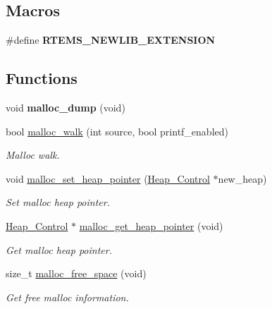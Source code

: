 \subsection*{Macros}
\begin{DoxyCompactItemize}
\item 
\#define {\bfseries R\+T\+E\+M\+S\+\_\+\+N\+E\+W\+L\+I\+B\+\_\+\+E\+X\+T\+E\+N\+S\+I\+ON}
\end{DoxyCompactItemize}
\subsection*{Functions}
\begin{DoxyCompactItemize}
\item 
\mbox{\label{group__libcsupport_ga984dfa88a9838d6dc1f39b7ccdf52274}} 
void {\bfseries malloc\+\_\+dump} (void)
\item 
\mbox{\label{group__libcsupport_ga503eebc15fd2bdcced2b1ea235713f6a}} 
bool \mbox{\hyperlink{group__libcsupport_ga503eebc15fd2bdcced2b1ea235713f6a}{malloc\+\_\+walk}} (int source, bool printf\+\_\+enabled)
\begin{DoxyCompactList}\small\item\em Malloc walk. \end{DoxyCompactList}\item 
void \mbox{\hyperlink{group__libcsupport_gae2bf8750f6321deff44d391c53df0922}{malloc\+\_\+set\+\_\+heap\+\_\+pointer}} (\mbox{\hyperlink{structHeap__Control}{Heap\+\_\+\+Control}} $\ast$new\+\_\+heap)
\begin{DoxyCompactList}\small\item\em Set malloc heap pointer. \end{DoxyCompactList}\item 
\mbox{\hyperlink{structHeap__Control}{Heap\+\_\+\+Control}} $\ast$ \mbox{\hyperlink{group__libcsupport_ga07f9ec5c7348c131b6f61e503ba3a35e}{malloc\+\_\+get\+\_\+heap\+\_\+pointer}} (void)
\begin{DoxyCompactList}\small\item\em Get malloc heap pointer. \end{DoxyCompactList}\item 
size\+\_\+t \mbox{\hyperlink{group__libcsupport_ga94bb8ab9f51bf5f8228de8068c1b5e86}{malloc\+\_\+free\+\_\+space}} (void)
\begin{DoxyCompactList}\small\item\em Get free malloc information. \end{DoxyCompactList}\item 

\end{DoxyCompactItemize}
